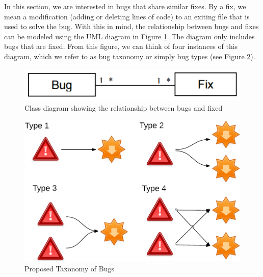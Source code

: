In this section, we are interested in bugs that share similar fixes.
By a fix, we mean a modification (adding or deleting lines of
code) to an exiting file that is used to solve the bug. With this
in mind, the relationship between bugs and fixes can be
modeled using the UML diagram in Figure \ref{fig:bug-taxo-diag}. The diagram
only includes bugs that are fixed. From this figure, we can
think of four instances of this diagram, which we refer to as
bug taxonomy or simply bug types (see Figure \ref{fig:bug-taxo}).



\begin{figure}[h!]
  \centering
    \includegraphics[scale=0.5]{media/bug-taxo-class-diag.png}
    \caption{Class diagram showing the relationship between bugs and fixed
    \label{fig:bug-taxo-diag}}
\end{figure}

\begin{figure}[h!]
  \centering
    \includegraphics[scale=0.8]{media/bug-taxo.png}
    \caption{Proposed Taxonomy of Bugs
    \label{fig:bug-taxo}}
\end{figure}


